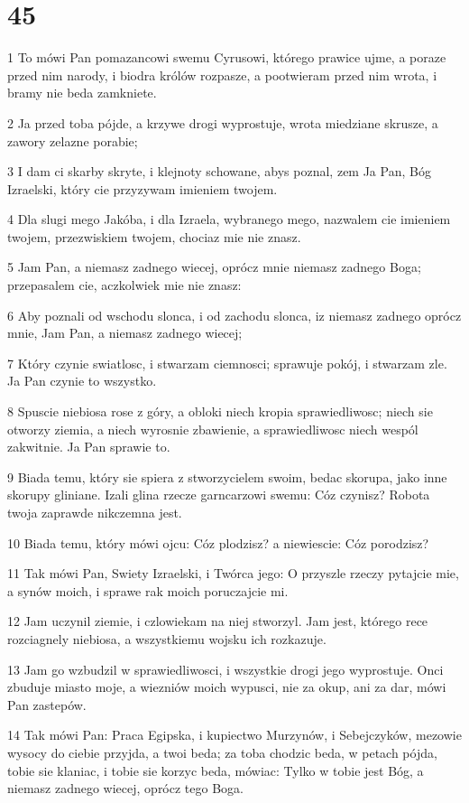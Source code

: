 \chapter{45}

\par 1 To mówi Pan pomazancowi swemu Cyrusowi, którego prawice ujme, a poraze przed nim narody, i biodra królów rozpasze, a pootwieram przed nim wrota, i bramy nie beda zamkniete.
\par 2 Ja przed toba pójde, a krzywe drogi wyprostuje, wrota miedziane skrusze, a zawory zelazne porabie;
\par 3 I dam ci skarby skryte, i klejnoty schowane, abys poznal, zem Ja Pan, Bóg Izraelski, który cie przyzywam imieniem twojem.
\par 4 Dla slugi mego Jakóba, i dla Izraela, wybranego mego, nazwalem cie imieniem twojem, przezwiskiem twojem, chociaz mie nie znasz.
\par 5 Jam Pan, a niemasz zadnego wiecej, oprócz mnie niemasz zadnego Boga; przepasalem cie, aczkolwiek mie nie znasz:
\par 6 Aby poznali od wschodu slonca, i od zachodu slonca, iz niemasz zadnego oprócz mnie, Jam Pan, a niemasz zadnego wiecej;
\par 7 Który czynie swiatlosc, i stwarzam ciemnosci; sprawuje pokój, i stwarzam zle. Ja Pan czynie to wszystko.
\par 8 Spuscie niebiosa rose z góry, a obloki niech kropia sprawiedliwosc; niech sie otworzy ziemia, a niech wyrosnie zbawienie, a sprawiedliwosc niech wespól zakwitnie. Ja Pan sprawie to.
\par 9 Biada temu, który sie spiera z stworzycielem swoim, bedac skorupa, jako inne skorupy gliniane. Izali glina rzecze garncarzowi swemu: Cóz czynisz? Robota twoja zaprawde nikczemna jest.
\par 10 Biada temu, który mówi ojcu: Cóz plodzisz? a niewiescie: Cóz porodzisz?
\par 11 Tak mówi Pan, Swiety Izraelski, i Twórca jego: O przyszle rzeczy pytajcie mie, a synów moich, i sprawe rak moich poruczajcie mi.
\par 12 Jam uczynil ziemie, i czlowiekam na niej stworzyl. Jam jest, którego rece rozciagnely niebiosa, a wszystkiemu wojsku ich rozkazuje.
\par 13 Jam go wzbudzil w sprawiedliwosci, i wszystkie drogi jego wyprostuje. Onci zbuduje miasto moje, a wiezniów moich wypusci, nie za okup, ani za dar, mówi Pan zastepów.
\par 14 Tak mówi Pan: Praca Egipska, i kupiectwo Murzynów, i Sebejczyków, mezowie wysocy do ciebie przyjda, a twoi beda; za toba chodzic beda, w petach pójda, tobie sie klaniac, i tobie sie korzyc beda, mówiac: Tylko w tobie jest Bóg, a niemasz zadnego wiecej, oprócz tego Boga.
